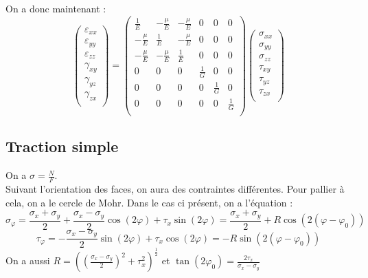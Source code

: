 \documentclass[../main.tex]{subfiles}
\begin{document}
On a donc maintenant : \\
\begin{equation}
    \begin{pmatrix}
    \varepsilon_{xx}\\
    \varepsilon_{yy}\\
    \varepsilon_{zz}\\
    \gamma_{xy}\\
    \gamma_{yz}\\
    \gamma_{zx}\\
    \end{pmatrix} = \begin{pmatrix}
        \frac{1}{E} & -\frac{\mu}{E} & -\frac{\mu}{E} & 0& 0&0\\
        -\frac{\mu}{E} & \frac{1}{E} & -\frac{\mu}{E} &0&0&0\\
        -\frac{\mu}{E}&-\frac{\mu}{E}&\frac{1}{E}&0&0&0\\
        0&0&0&\frac{1}{G}&0&0\\
        0&0&0&0&\frac{1}{G}&0\\
        0&0&0&0&0&\frac{1}{G}\\
    \end{pmatrix} \begin{pmatrix}
    \sigma_{xx}\\
    \sigma_{yy}\\
    \sigma_{zz}\\
    \tau_{xy}\\
    \tau_{yz}\\
    \tau_{zx}\\
    \end{pmatrix}
\end{equation}

\subsection{Traction simple}
On a $\sigma = \frac{N}{F}$.\\
Suivant l'orientation des faces, on aura des contraintes différentes. Pour pallier à cela, on a le cercle de Mohr. Dans le cas ci présent, on a l'équation :\\
\begin{equation}
    \sigma_{\varphi} = \frac{\sigma_x + \sigma_y}{2} + \frac{\sigma_x - \sigma_y}{2}\cos(2\varphi) + \tau_x \sin(2\varphi) = \frac{\sigma_x + \sigma_y}{2} + R \cos(2(\varphi-\varphi_0))
\end{equation}
\begin{equation}
    \tau_{\varphi} = -\frac{\sigma_x - \sigma_y}{2} \sin(2\varphi) + \tau_x \cos(2\varphi) = -R\sin(2(\varphi-\varphi_0))
\end{equation}
On a aussi $R = ((\frac{\sigma_x - \sigma_y}{2})^2+\tau_x^2)^{\frac{1}{2}}$ et $\tan(2\varphi_0) = \frac{2\tau_x}{\sigma_x - \sigma_y}$\\
\end{document}
